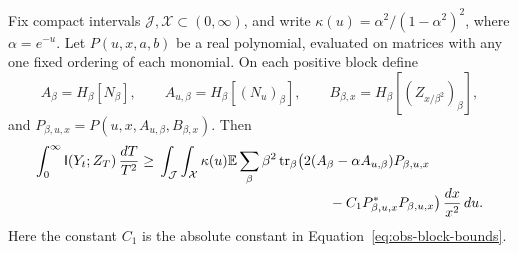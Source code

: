 \begin{lemma}
\label{lem:obs-block-tests}
Fix compact intervals $\mathcal J,\mathcal X\subset(0,\infty)$, and
write $\kappa(u)=\alpha^2/(1-\alpha^2)^2$, where $\alpha=e^{-u}$.
Let $P(u,x,a,b)$ be a real polynomial, evaluated on matrices with any
one fixed ordering of each monomial.  On each positive block define
\[
 A_\beta=H_\beta[N_\beta],\qquad
 A_{u,\beta}=H_\beta[(N_u)_\beta],\qquad
 B_{\beta,x}=H_\beta[(Z_{x/\beta^2})_\beta],
\]
and $P_{\beta,u,x}=P(u,x,A_{u,\beta},B_{\beta,x})$.  Then
\begin{align}
 \int_0^\infty\MI(Y_t;Z_T)\,\frac{dT}{T^2}
 \ge{}&\int_{\mathcal J}\int_{\mathcal X}\kappa(u)
 \E\sum_\beta\beta^2\tr_\beta
 \bigl(2(A_\beta-\alpha A_{u,\beta})P_{\beta,u,x}
 \notag\\[-2pt]
 &\hspace{43mm}-C_1P_{\beta,u,x}^*P_{\beta,u,x}\bigr)
 \,\frac{dx}{x^2}\,du.
 \label{eq:obs-block-test-bound}
\end{align}
Here the constant $C_1$ is the absolute constant in
Equation~\eqref{eq:obs-block-bounds}.
\end{lemma}

